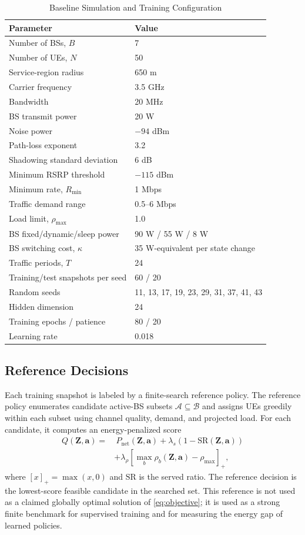 \documentclass[journal]{IEEEtran}
\begin{document}
\begin{table}[!t]
\caption{Baseline Simulation and Training Configuration}
\label{tab:sim_params}
\centering
\begin{tabular}{ll}
\toprule
Parameter & Value \\
\midrule
Number of BSs, $B$ & 7 \\
Number of UEs, $N$ & 50 \\
Service-region radius & 650 m \\
Carrier frequency & 3.5 GHz \\
Bandwidth & 20 MHz \\
BS transmit power & 20 W \\
Noise power & $-94$ dBm \\
Path-loss exponent & 3.2 \\
Shadowing standard deviation & 6 dB \\
Minimum RSRP threshold & $-115$ dBm \\
Minimum rate, $R_{\min}$ & 1 Mbps \\
Traffic demand range & 0.5--6 Mbps \\
Load limit, $\rho_{\max}$ & 1.0 \\
BS fixed/dynamic/sleep power & 90 W / 55 W / 8 W \\
BS switching cost, $\kappa$ & 35 W-equivalent per state change \\
Traffic periods, $T$ & 24 \\
Training/test snapshots per seed & 60 / 20 \\
Random seeds & 11, 13, 17, 19, 23, 29, 31, 37, 41, 43 \\
Hidden dimension & 24 \\
Training epochs / patience & 80 / 20 \\
Learning rate & 0.018 \\
\bottomrule
\end{tabular}
\end{table}

\subsection{Reference Decisions}
Each training snapshot is labeled by a finite-search reference policy. The
reference policy enumerates candidate active-BS subsets
$\mathcal{A}\subseteq\mathcal{B}$ and assigns UEs greedily within each subset
using channel quality, demand, and projected load. For each candidate, it
computes an energy-penalized score
\begin{align}
    Q(\mathbf{Z},\mathbf{a})
    =&\ P_{\mathrm{net}}(\mathbf{Z},\mathbf{a})
    +\lambda_s\left(1-\mathrm{SR}(\mathbf{Z},\mathbf{a})\right) \nonumber\\
    &+\lambda_{\rho}
    \left[\max_b \rho_b(\mathbf{Z},\mathbf{a})-\rho_{\max}\right]_+,
    \label{eq:reference_score}
\end{align}
where $[x]_+=\max(x,0)$ and $\mathrm{SR}$ is the served ratio. The reference
decision is the lowest-score feasible candidate in the searched set. This
reference is not used as a claimed globally optimal solution of
\eqref{eq:objective}; it is used as a strong finite benchmark for supervised
training and for measuring the energy gap of learned policies.
\end{document}
